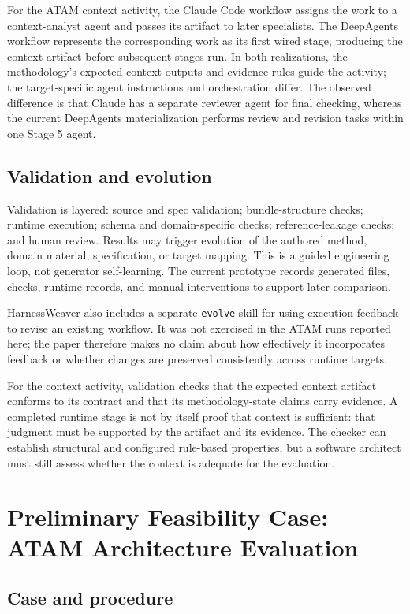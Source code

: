 \documentclass[10pt,conference]{IEEEtran}
\begin{document}
For the ATAM context activity, the Claude Code workflow assigns the work to a context-analyst agent and passes its artifact to later specialists. The DeepAgents workflow represents the corresponding work as its first wired stage, producing the context artifact before subsequent stages run. In both realizations, the methodology's expected context outputs and evidence rules guide the activity; the target-specific agent instructions and orchestration differ. The observed difference is that Claude has a separate reviewer agent for final checking, whereas the current DeepAgents materialization performs review and revision tasks within one Stage 5 agent.

\subsection{Validation and evolution}

Validation is layered: source and spec validation; bundle-structure checks; runtime execution; schema and domain-specific checks; reference-leakage checks; and human review. Results may trigger evolution of the authored method, domain material, specification, or target mapping. This is a guided engineering loop, not generator self-learning. The current prototype records generated files, checks, runtime records, and manual interventions to support later comparison.

HarnessWeaver also includes a separate \texttt{evolve} skill for using execution feedback to revise an existing workflow. It was not exercised in the ATAM runs reported here; the paper therefore makes no claim about how effectively it incorporates feedback or whether changes are preserved consistently across runtime targets.

For the context activity, validation checks that the expected context artifact conforms to its contract and that its methodology-state claims carry evidence. A completed runtime stage is not by itself proof that context is sufficient: that judgment must be supported by the artifact and its evidence. The checker can establish structural and configured rule-based properties, but a software architect must still assess whether the context is adequate for the evaluation.

\section{Preliminary Feasibility Case: ATAM Architecture Evaluation}

\subsection{Case and procedure}
\end{document}
